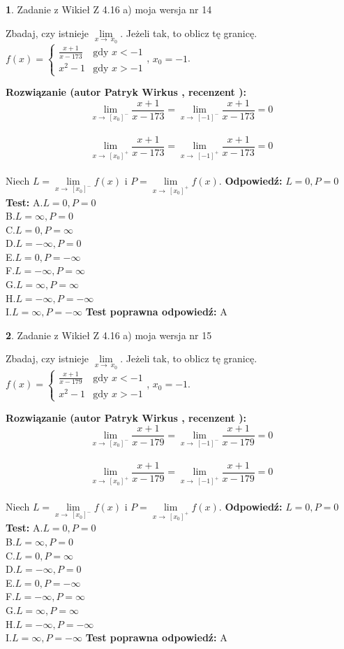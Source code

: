 \documentclass[12pt, a4paper]{article}
\theoremstyle{definition} %
\newtheorem{zad}{}
\newcommand{\zadStart}[1]{\begin{zad}#1\newline}
\newcommand{\zadStop}{\end{zad}}
\newcommand{\rozwStart}[2]{\noindent \textbf{Rozwiązanie (autor #1 , recenzent #2): }\newline}
\newcommand{\rozwStop}{\newline}
\newcommand{\odpStart}{\noindent \textbf{Odpowiedź:}\newline}
\newcommand{\odpStop}{\newline}
\newcommand{\testStart}{\noindent \textbf{Test:}\newline}
\newcommand{\testStop}{\newline}
\newcommand{\kluczStart}{\noindent \textbf{Test poprawna odpowiedź:}\newline}
\newcommand{\kluczStop}{\newline}
\begin{document}
\zadStart{Zadanie z Wikieł Z 4.16 a) moja wersja nr 14}

Zbadaj, czy istnieje $\lim\limits_{x\to\ x_{0}}$. Jeżeli tak, to oblicz tę granicę.\\   $f(x) = \left\{ \begin{array}{ll}
\frac{x+1}{x-173} & \textrm{gdy $x<-1$}\\
x^{2}-1 & \textrm{gdy $x>-1$}
\end{array} \right.$, $x_{0}=-1$.
\zadStop
\rozwStart{Patryk Wirkus}{}
$$\lim\limits_{x\to\ [x_{0}]^{-}}\frac{x+1}{x-173} = \lim\limits_{x\to\ [-1]^{-}}\frac{x+1}{x-173} = 0$$
\\
$$\lim\limits_{x\to\ [x_{0}]^{+}}\frac{x+1}{x-173} = \lim\limits_{x\to\ [-1]^{+}}\frac{x+1}{x-173} = 0$$
\\
Niech $L=\lim\limits_{x\to\ [x_{0}]^{-}}f(x)$ i $P=\lim\limits_{x\to\ [x_{0}]^{+}}f(x)$.
\rozwStop
\odpStart
$L=0, P=0$
\odpStop
\testStart
A.$L=0, P=0$\\ B.$L=\infty, P=0$\\ C.$L=0, P=\infty$\\ D.$L=-\infty, P=0$\\ E.$L=0, P=-\infty$\\
F.$L=-\infty, P=\infty$\\ G.$L=\infty, P=\infty$\\
H.$L=-\infty, P=-\infty$\\
I.$L=\infty, P=-\infty$
\testStop
\kluczStart
A
\kluczStop



\zadStart{Zadanie z Wikieł Z 4.16 a) moja wersja nr 15}

Zbadaj, czy istnieje $\lim\limits_{x\to\ x_{0}}$. Jeżeli tak, to oblicz tę granicę.\\   $f(x) = \left\{ \begin{array}{ll}
\frac{x+1}{x-179} & \textrm{gdy $x<-1$}\\
x^{2}-1 & \textrm{gdy $x>-1$}
\end{array} \right.$, $x_{0}=-1$.
\zadStop
\rozwStart{Patryk Wirkus}{}
$$\lim\limits_{x\to\ [x_{0}]^{-}}\frac{x+1}{x-179} = \lim\limits_{x\to\ [-1]^{-}}\frac{x+1}{x-179} = 0$$
\\
$$\lim\limits_{x\to\ [x_{0}]^{+}}\frac{x+1}{x-179} = \lim\limits_{x\to\ [-1]^{+}}\frac{x+1}{x-179} = 0$$
\\
Niech $L=\lim\limits_{x\to\ [x_{0}]^{-}}f(x)$ i $P=\lim\limits_{x\to\ [x_{0}]^{+}}f(x)$.
\rozwStop
\odpStart
$L=0, P=0$
\odpStop
\testStart
A.$L=0, P=0$\\ B.$L=\infty, P=0$\\ C.$L=0, P=\infty$\\ D.$L=-\infty, P=0$\\ E.$L=0, P=-\infty$\\
F.$L=-\infty, P=\infty$\\ G.$L=\infty, P=\infty$\\
H.$L=-\infty, P=-\infty$\\
I.$L=\infty, P=-\infty$
\testStop
\kluczStart
A
\kluczStop
\end{document}
